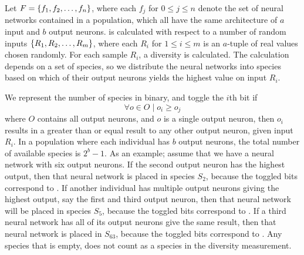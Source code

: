 Let $F = \left\{ f_1, f_2, \dots, f_n \right\}$, where each $f_j$ for $0 \leq j \leq n$ denote the set of neural networks contained in a population, which all have the same architecture of $a$ input and $b$ output neurons. \dia{} is calculated with respect to a number of random inputs $\left\{ R_1, R_2, \dots, R_m \right\}$, where each $R_i$ for $1 \leq i \leq m$ is an $a$-tuple of real values chosen randomly. For each sample $R_i$, a diversity is calculated. The calculation depends on a set of species, so we distribute the neural networks into species based on which of their output neurons yields the highest value on input $R_i$. 

We represent the number of species in binary, and toggle the $i$th bit if 
\[\forall o \in O\; \lvert\; o_i \geq o_j\]
where $O$ contains all output neurons, and $o$ is a single output neuron, then $o_i$ results in a greater than or equal result to any other output neuron, given input $R_i$.
In a population where each individual has $b$ output neurons, the total number of available species is $2^b - 1$.  As an example; assume that we have a neural network with six output neurons. If the second output neuron has the highest output, then that neural network is placed in species $S_2$, because the toggled bits correspond to . If another individual has multiple output neurons giving the highest output, say the first and third output neuron, then that neural network will be placed in species $S_5$, because the toggled bits correspond to . If a third neural network has all of its output neurons give the same result, then that neural network is placed in $S_{63}$, because the toggled bits correspond to . Any species that is empty, does not count as a species in the diversity measurement.


%
%


